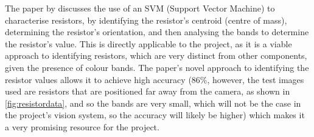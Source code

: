 The paper by \citet{8939034} discusses the use of an SVM (Support Vector Machine) to characterise resistors, by identifying the resistor's centroid (centre of mass), determining the resistor's orientation, and then analysing the bands to determine the resistor's value. This is directly applicable to the project, as it is a viable approach to identifying resistors, which are very distinct from other components, given the presence of colour bands. The paper's novel approach to identifying the resistor values allows it to achieve high accuracy (86\%, however, the test images used are resistors that are positioned far away from the camera, as shown in  \autoref{fig:resistordata}, and so the bands are very small, which will not be the case in the project's vision system, so the accuracy will likely be higher) which makes it a very promising resource for the project.


